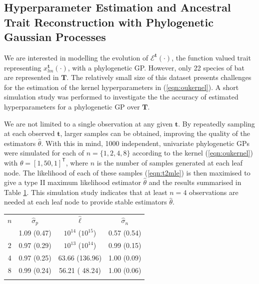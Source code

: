 \documentclass{ws-rv9x6}
\begin{document}
\subsection{Hyperparameter Estimation and Ancestral Trait Reconstruction with Phylogenetic Gaussian Processes}

We are interested in modelling the evolution of \(\mathcal{E}^{\mathbf{t}}(\cdot)\), the function valued trait representing \(x_{lm}^{\mathbf{t}}(\cdot)\), with a phylogenetic GP. However, only 22 species of bat are represented in \(\mathbf{T}\). The relatively small size of this dataset presents challenges for the estimation of the kernel hyperparameters in (\ref{eqn:oukernel}). A short simulation study was performed to investigate the the accuracy of estimated hyperparameters for a phylogenetic GP over \(\mathbf{T}\).

We are not limited to a single observation at any given \(\mathbf{t}\). By repeatedly sampling at each observed \(\mathbf{t}\), larger samples can be obtained, improving the quality of the estimators \(\hat{\theta}\). With this in mind, 1000 independent, univariate phylogenetic GPs were simulated for each of \(n = \{1,2,4,8\}\) according to the kernel (\ref{eqn:oukernel}) with \(\theta = [1,50,1]^{\mathsf{T}}\), where \(n\) is the number of samples generated at each leaf node. The likelihood of each of these samples (\ref{eqn:t2mle}) is then maximised to give a type II maximum likelihood estimator \(\hat{\theta}\) and the results summarised in Table \ref{tab::ind_simulation}. This simulation study indicates that at least \(n = 4\) observations are needed at each leaf node to provide stable estimators \(\hat{\theta}\).

\begin{table}[ht]
	{
		\begin{tabular}{@{}cccc@{}} \toprule
			\(n\)  & \(\hat{\sigma}_p \) & \(\hat{\ell}\) & \(\hat{\sigma}_n\) \\
			\colrule
			1 & 1.09 (0.47) & \(10^{14}\) (\(10^{15}\)) & 0.57 (0.54) \\
			2 & 0.97 (0.29) & \(10^{13}\) (\(10^{14}\)) & 0.99 (0.15) \\
			4 & 0.97 (0.25) & 63.66 (136.96) & 1.00 (0.09) \\
			8 & 0.99 (0.24) & 56.21 ( 48.24) & 1.00 (0.06) \\			
			\botrule
		\end{tabular}
	}
	\label{tab::ind_simulation}
\end{table}
\end{document}
